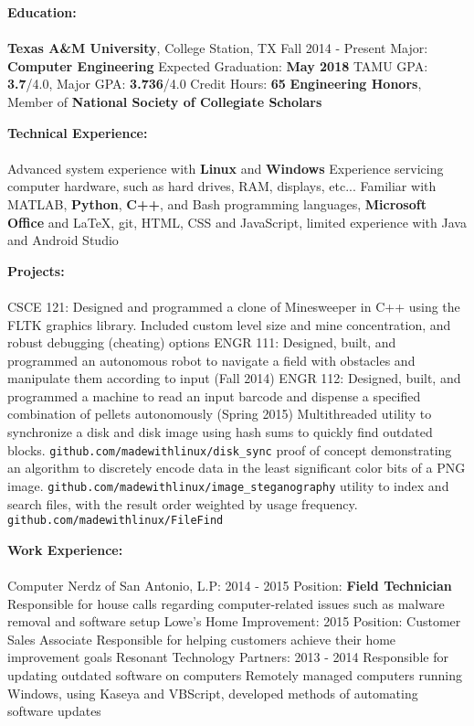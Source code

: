 \documentclass[12pt]{article}
\newcommand{\upspace}{\vspace{0px}}
\newcommand{\zzz}[1]{\upspace \0 \textbf{#1} \\ \vspace{-0.7\baselineskip} \hrulefill \vspace{-2px} \\ }
\newcommand{\aaa}{\upspace \1}
\newcommand{\bbb}{\upspace \2}
\begin{document}
\begin{flushleft}
\begin{outline}[compactitem]

\zzz{Education:}
	\aaa \textbf{Texas A\&M University}, College Station, TX \hfill Fall 2014 - Present
		\bbb Major: \textbf{Computer Engineering}
		\bbb Expected Graduation: \textbf{May 2018}
		\bbb TAMU GPA: \textbf{3.7}/4.0, Major GPA: \textbf{3.736}/4.0
		\bbb Credit Hours: \textbf{65}
		\bbb \textbf{Engineering Honors}, Member of \textbf{National Society of Collegiate Scholars}

\zzz{Technical Experience:}
	\aaa Advanced system experience with \textbf{Linux} and \textbf{Windows}
	\aaa Experience servicing computer hardware, such as hard drives, RAM, displays, etc...
	\aaa Familiar with MATLAB, \textbf{Python}, \textbf{C++}, and Bash programming languages, 
	\textbf{Microsoft Office} and LaTeX, git, HTML, CSS and JavaScript, limited experience with Java and Android Studio

\zzz{Projects:}
	\aaa CSCE 121: Designed and programmed a clone of Minesweeper in C++ using the FLTK graphics library. Included custom level size and mine concentration, and robust debugging (cheating) options
	\aaa ENGR 111: Designed, built, and programmed an autonomous robot to navigate 
	a field with obstacles and manipulate them according to input (Fall 2014)
	\aaa ENGR 112: Designed, built, and programmed a machine to read an input 
	barcode and dispense a specified combination of pellets autonomously (Spring 2015)
	\aaa Multithreaded utility to synchronize a disk and disk image using hash sums to quickly find outdated blocks.
		\verb|github.com/madewithlinux/disk_sync|
	\aaa proof of concept demonstrating an algorithm to discretely encode data in the least significant color bits of a PNG image.
		\verb|github.com/madewithlinux/image_steganography|
	\aaa utility to index and search files, with the result order weighted by usage frequency.
		\verb|github.com/madewithlinux/FileFind|

\zzz{Work Experience:}
	\aaa Computer Nerdz of San Antonio, L.P: \hfill 2014 - 2015
		\bbb Position: \textbf{Field Technician}
		\bbb Responsible for house calls regarding computer-related issues such as malware removal and software setup
	\aaa Lowe's Home Improvement: \hfill 2015
		\bbb Position: Customer Sales Associate
		\bbb Responsible for helping customers achieve their home improvement goals
	\aaa Resonant Technology Partners: \hfill 2013 - 2014
		\bbb Responsible for updating outdated software on computers
		\bbb Remotely managed computers running Windows, using Kaseya and VBScript, developed methods of automating software updates


\end{outline}
\end{flushleft}
\end{document}

